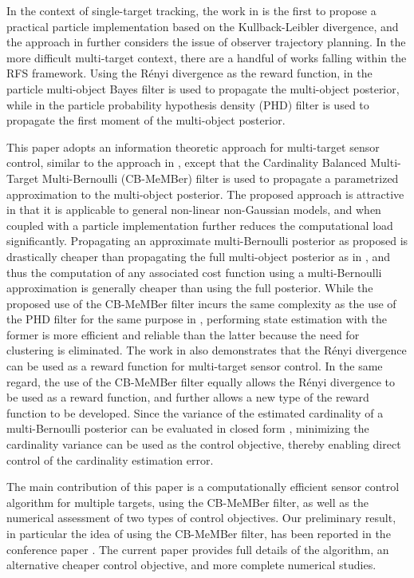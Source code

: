 \documentclass[twocolumn]{autart}
\begin{document}
In the context of single-target tracking, the work in \cite{DVA02} is the
first to propose a practical particle implementation based on the
Kullback-Leibler divergence, and the approach in \cite{SKV07} further
considers the issue of observer trajectory planning. In the more difficult
multi-target context, there are a handful of works falling within the RFS
framework. Using the R\'{e}nyi divergence as the reward function, in \cite {RV10} the particle multi-object Bayes filter \cite{VoAES} is used to
propagate the multi-object posterior, while in \cite{RVC11} the particle
probability hypothesis density (PHD) filter \cite{VoAES} is used to
propagate the first moment of the multi-object posterior.

This paper adopts an information theoretic approach for multi-target sensor
control, similar to the approach in \cite{RV10,RVC11}, except that the
Cardinality Balanced Multi-Target Multi-Bernoulli (CB-MeMBer) filter \cite {VVC09} is used to propagate a parametrized approximation to the
multi-object posterior. The proposed approach is attractive in that it is
applicable to general non-linear non-Gaussian models, and when coupled with
a particle implementation further reduces the computational load
significantly. Propagating an approximate multi-Bernoulli posterior as
proposed is drastically cheaper than propagating the full multi-object
posterior as in \cite{RV10}, and thus the computation of any associated cost
function using a multi-Bernoulli approximation is generally cheaper than
using the full posterior. While the proposed use of the CB-MeMBer filter
incurs the same complexity as the use of the PHD filter for the same purpose
in \cite{RVC11}, performing state estimation with the former is more
efficient and reliable than the latter because the need for clustering is
eliminated. The work in \cite{RV10,RVC11} also demonstrates that the R\'{e}nyi divergence can be used as a reward function for multi-target sensor
control. In the same regard, the use of the CB-MeMBer filter equally allows
the R\'{e}nyi divergence to be used as a reward function, and further allows a
new type of the reward function to be developed. Since the variance of the
estimated cardinality of a multi-Bernoulli posterior can be evaluated in
closed form \cite{Mah07}, minimizing the cardinality variance can be used as
the control objective, thereby enabling direct control of the cardinality
estimation error.

The main contribution of this paper is a computationally efficient sensor
control algorithm for multiple targets, using the CB-MeMBer filter, as well
as the numerical assessment of two types of control objectives. Our
preliminary result, in particular the idea of using the CB-MeMBer filter,
has been reported in the conference paper \cite{HGH12}. The current paper
provides full details of the algorithm, an alternative cheaper control
objective, and more complete numerical studies.
\end{document}
